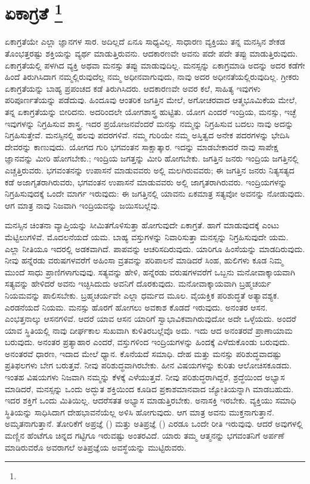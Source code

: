 
\chapter[ಏಕಾಗ್ರತೆ ]{ಏಕಾಗ್ರತೆ \protect\footnote{}}

ಏಕಾಗ್ರತೆಯೇ ಎಲ್ಲಾ ಜ್ಞಾನಗಳ ಸಾರ. ಅದಿಲ್ಲದೆ ಏನೂ ಸಾಧ್ಯವಿಲ್ಲ. ಸಾಧಾರಣ ವ್ಯಕ್ತಿಯು ತನ್ನ ಮನಸ್ಸಿನ ಶೇಕಡ ತೊಂಭತ್ತರಷ್ಟು ಶಕ್ತಿಯನ್ನು ವ್ಯರ್ಥ ಮಾಡುತ್ತಿರುವನು. ಆದ\-ಕಾರಣವೇ ಅವನು ಪದೇ ಪದೇ ತಪ್ಪು ಮಾಡುತ್ತಿರುವುದು. ಏಕಾಗ್ರತೆಯಲ್ಲಿ ಪಳಗಿದ ವ್ಯಕ್ತಿ ಅಥವಾ ಮನಸ್ಸು ತಪ್ಪು ಮಾಡುವುದಿಲ್ಲ. ಮನಸ್ಸನ್ನು ಏಕಾಗ್ರಮಾಡಿ ಅದನ್ನು ಅದರ ಕಡೆಗೇ ಹಿಂದೆ ತಿರುಗಿಸಿದಾಗ ನಮ್ಮಲ್ಲಿರುವುದೆಲ್ಲ ನಮ್ಮ ಅಧೀನವಾಗುವುದು, ನಾವು ಅದರ ಅಧೀನತೆಯಲ್ಲಿರುವುದಿಲ್ಲ. ಗ್ರೀಕರು ಏಕಾಗ್ರತೆಯನ್ನು ಬಾಹ್ಯ ಪ್ರಪಂಚದ ಕಡೆ ತಿರುಗಿಸಿದರು. ಆದಕಾರಣವೇ ಅವರ ಕಲೆ, ಸಾಹಿತ್ಯ ಇವುಗಳು ಪರಿಪೂರ್ಣತೆಯನ್ನು ಪಡೆದುವು. ಹಿಂದೂವು ಆಂತರಿಕ ಜಗತ್ತಿನ ಮೇಲೆ, ಅಗೋಚರವಾದ ಆತ್ಮಭೂಮಿಕೆಯ ಮೇಲೆ, ತನ್ನ ಏಕಾಗ್ರತೆಯನ್ನು ಬೀರಿದನು. ಅದರಿಂದಲೇ ಯೋಗಶಾಸ್ತ್ರ ಹುಟ್ಟಿತು. ಯೋಗ ಎಂದರೆ ಇಂದ್ರಿಯ, ಮನಸ್ಸು, ಇಚ್ಛೆ ಇವುಗಳನ್ನು ನಿಗ್ರಹಿಸುವ ಶಾಸ್ತ್ರ. ಇದರ ಪ್ರಯೋಜನವೆಂದರೆ ಮನಸ್ಸು ನಮ್ಮನ್ನು ನಿಗ್ರಹಿಸುವ ಬದಲು ನಾವು ಅದನ್ನು ನಿಗ್ರಹಿಸುತ್ತೇವೆ. ಮನಸ್ಸಿನಲ್ಲಿ ಹಲವು ಪದರಗಳಿವೆ. ನಮ್ಮ ಗುರಿಯೇ ನಮ್ಮ ಅಸ್ತಿತ್ವದ ಅನೇಕ ಪದರಗಳನ್ನು ಭೇದಿಸಿ ದೇವರನ್ನು ಕಾಣುವುದು. ಯೋಗದ ಗುರಿ ಭಗವಂತನ ಸಾಕ್ಷಾತ್ಕಾರ. ಇದನ್ನು ಮಾಡಬೇಕಾದರೆ ನಾವು ಸಾಪೇಕ್ಷ ಜ್ಞಾನವನ್ನು ಮೀರಿ ಹೋಗಬೇಕು.; ಇಂದ್ರಿಯ ಜಗತ್ತನ್ನು ಮೀರಿ ಹೋಗಬೇಕು. ಜಗತ್ತಿನ ಜನರು ಇಂದ್ರಿಯ ಜಗತ್ತಿನಲ್ಲಿ ಎಚ್ಚತ್ತಿರುವರು. ಭಗವಂತನನ್ನು ಉಪಾಸನೆ ಮಾಡುವವರು ಅಲ್ಲಿ ಮಲಗಿರುವವರು; ಈ ಜಗತ್ತಿನ ಜನರು ನಿತ್ಯಸತ್ಯದ ಕಡೆ ಅಜಾಗೃತರಾಗಿರುವರು, ಭಗವಂತನ ಉಪಾಸನೆ ಮಾಡುವವರು ಅಲ್ಲಿ ಜಾಗೃತರಾಗಿರುವರು. ಇಂದ್ರಿಯಗಳನ್ನು ನಿಗ್ರಹಿಸುವುದಕ್ಕೆ ಒಂದೇ ಮಾರ್ಗ ಇರುವುದು: ಈ ಜಗತ್ತಿನಲ್ಲಿ ಯಾವನು ಏಕಮಾತ್ರ ಸತ್ಯವೋ ಅವನನ್ನು ನೋಡುವುದು. ಆಗ ಮಾತ್ರ ನಾವು ನಿಜವಾಗಿ ಇಂದ್ರಿಯವನ್ನು ಜಯಿಸಬಲ್ಲೆವು.

ಮನಸ್ಸಿನ ಚಿಂತನಾ ವ್ಯಾಪ್ತಿಯನ್ನು ಸೀಮಿತಗೊಳಿಸುತ್ತಾ ಹೋಗುವುದೇ ಏಕಾಗ್ರತೆ. ಹಾಗೆ ಮಾಡುವುದಕ್ಕೆ ಎಂಟು ಮೆಟ್ಟಿಲುಗಳಿವೆ. ಮೊದಲನೆಯದೆ ಯಮ. ಬಾಹ್ಯ ವಸ್ತುಗಳನ್ನು ನಿವಾರಿಸುತ್ತಾ ಮನಸ್ಸನ್ನು ನಿಗ್ರಹಿಸುವುದೇ ಯಮ. ಎಲ್ಲಾ ನೀತಿಯೂ ಇದರಲ್ಲಿ ಅಡಕವಾಗಿದೆ. ಪಾಪವನ್ನು ಆಚರಿಸದಿರುವುದು. ಯಾರಿಗೂ ಹಿಂಸೆಯನ್ನು ಮಾಡದಿರುವುದು. ನೀವು ಹನ್ನೆರಡು ವರುಷಗಳವರೆಗೆ ಅಹಿಂಸಾ ವ್ರತವನ್ನು ಪರಿಪಾಲನೆ ಮಾಡಿದರೆ ಸಿಂಹ, ಹುಲಿಗಳು ಕೂಡ ನಿಮ್ಮ ಮುಂದೆ ಸಾಧು ಪ್ರಾಣಿಗಳಾಗುವುವು. ಸತ್ಯವನ್ನು ಹೇಳಿ, ಹನ್ನೆರಡು ವರುಷಗಳವರೆಗೆ ಒಬ್ಬನು ಮನೋವಾಕ್ಕಾಯವಾಗಿ ಸತ್ಯವನ್ನು ಹೇಳಿದರೆ ಅವನು ಇಚ್ಛಿಸಿದುದು ಅವನಿಗೆ ದೊರಕುವುದು. ಮನೋವಾಕ್ಕಾಯವಾಗಿ ಬ್ರಹ್ಮಚರ್ಯ ನಿಯಮವನ್ನು ಪಾಲಿಸಬೇಕು. ಬ್ರಹ್ಮಚರ್ಯವೇ ಎಲ್ಲಾ ಧರ್ಮದ ಮೂಲ. ವೈಯಕ್ತಿಕ ಪರಿಶುದ್ಧತೆ ಅತ್ಯಾವಶ್ಯಕ. ಎರಡನೆಯದೆ ನಿಯಮ. ಮನಸ್ಸು ಹೊರಗೆ ಹೋಗಲು ಅವಕಾಶ ಕೊಡದೆ ಇರುವುದು. ಅನಂತರ ಆಸನ. ಎಂಭತ್ತನಾಲ್ಕು ಆಸನಗಳಿವೆ. ಆದರೆ ಯಾವ ಆಸನ ಯಾರಿಗೆ ಸ್ವಾಭಾವಿಕವಾಗಿರುವುದೋ ಅದೇ ಒಳ್ಳೆಯದು. ಅಂದರೆ ಯಾವ ಸ್ಥಿತಿಯಲ್ಲಿ ನಾವು ದೀರ್ಘಕಾಲ ಸುಖವಾಗಿ ಕುಳಿತಿರಬಲ್ಲೆವೊ ಅದು. ಇದು ಆದ ಅನಂತರವೆ ಪ್ರಾಣಾಯಾಮ ಬರುವುದು. ಅನಂತರ ಪ್ರತ್ಯಾಹಾರ ಎಂದರೆ, ವಸ್ತುಗಳಿಂದ ಇಂದ್ರಿಯಗಳನ್ನು ಹಿಂದಕ್ಕೆ ಎಳೆದುಕೊಂಡು ಬರುವುದು. ಅನಂತರವೆ ಧಾರಣ, ಇದಾದ ಮೇಲೆ ಧ್ಯಾನ. ಕೊನೆಯದೆ ಸಮಾಧಿ. ದೇಹ ಮತ್ತು ಮನಸ್ಸು ಪರಿಶುದ್ಧವಾದಷ್ಟು ಪ್ರತಿಫಲಗಳು ಬೇಗ ಬರುತ್ತವೆ. ನೀವು ಪರಿಶುದ್ಧವಾಗಿರಬೇಕು. ಹೀನ ವಿಷಯಗಳನ್ನು ಕುರಿತು ಆಲೋಚಿಸಕೂಡದು. ಇಂತಹ ವಿಷಯಗಳು ನಿಜವಾಗಿ ನಮ್ಮನ್ನು ಕೆಳಕ್ಕೆ ಎಳೆಯುತ್ತವೆ. ನೀವು ಪರಿಶುದ್ಧರಾಗಿದ್ದರೆ, ಶ್ರದ್ಧೆಯಿಂದ ಅಭ್ಯಾಸ ಮಾಡಿದರೆ, ಮನಸ್ಸನ್ನು ಒಂದು ಅದ್ಭುತ ಶಕ್ತಿಯಿಂದ ಕೂಡಿದ ಪ್ರಕಾಶಮಾನವಾದ ಜ್ಯೋತಿಯನ್ನಾಗಿ ಮಾಡಬಹುದು. ಇದರ ಶಕ್ತಿಗೆ ಒಂದು ಮಿತಿಯಿಲ್ಲ. ಆದರೆ\break ಸತತ ಅಭ್ಯಾಸ ಮಾಡುತ್ತಿರಬೇಕು. ಅನಾಸಕ್ತಿ ಇರಬೇಕು. ವ್ಯಕ್ತಿಯು ಸಮಾಧಿ ಸ್ಥಿತಿಯನ್ನು ಸಾಧಿಸಿದಾಗ ದೇಹಭಾವನೆಯೆಲ್ಲ ಅಳಿಸಿ ಹೋಗುವುದು. ಆಗ ಮಾತ್ರ ಅವನು ಮುಕ್ತನಾಗುತ್ತಾನೆ. ಅಮೃತನಾಗುತ್ತಾನೆ. ತೋರಿಕೆಗೆ ಅಪ್ರಜ್ಞೆ () ಮತ್ತು ಅತಿಪ್ರಜ್ಞೆ () ಎರಡೂ ಒಂದೇ ರೀತಿ ಇರುವುವು. ಆದರೆ ಅವುಗಳಲ್ಲಿ ಮಣ್ಣಿನ ಹೆಂಟೆಗೂ ಚಿನ್ನದ ಗಟ್ಟಿಗೂ ಇರುವಷ್ಟು ಅಂತರವಿದೆ. ಯಾರು ತಮ್ಮ ಆತ್ಮನನ್ನು ಭಗವಂತನಿಗೆ ಅರ್ಪಣೆ ಮಾಡಿರುವರೊ ಅವರಾಗಲೆ ಅತಿಪ್ರಜ್ಞೆಯ ಅವಸ್ಥೆಯನ್ನು ಮುಟ್ಟಿರುವರು.

